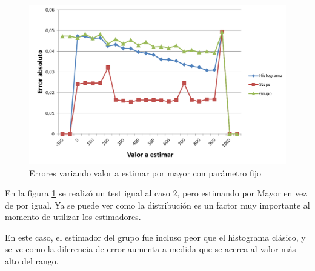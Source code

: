 		\quad	

	\begin{figure}[H]
	  \begin{center}
	    \includegraphics[scale=.55]{imagenes/C0_variando_valor_greater.png}
	    \caption{Errores variando valor a estimar por mayor con par\'ametro fijo} 
	    \label{fig:C0_variando_valor_greater}
	  \end{center}
	\end{figure}	

		En la figura \ref{fig:C0_variando_valor_greater} se realiz\'o un test igual al caso 2, pero estimando por Mayor en vez de por igual. Ya se puede ver como la distribuci\'on es un factor muy importante al momento de utilizar los estimadores.
		
		En este caso, el estimador del grupo fue incluso peor que el histograma cl\'asico, y se ve como la diferencia de error aumenta a medida que se acerca al valor m\'as alto del rango.